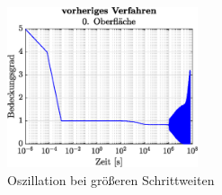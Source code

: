 \documentclass{listhesis}
\begin{document}
\begin{figure}[]
\centering
\includegraphics[width=0.5\textwidth]{./include/figure_5.0/old/covFacet0.eps} 
\caption{Oszillation bei größeren Schrittweiten}
\label{fig:oscillation}
\end{figure}
\end{document}
